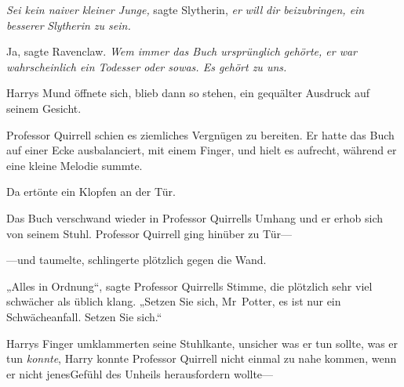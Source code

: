 \emph{Sei kein naiver kleiner Junge,} sagte Slytherin, \emph{er} \emph{will} \emph{dir beizubringen, ein} \emph{besserer} \emph{Slytherin zu sein.}

Ja, sagte Ravenclaw. \emph{Wem immer das Buch ursprünglich gehörte, er war wahrscheinlich ein Todesser oder sowas. Es gehört zu uns.}

Harrys Mund öffnete sich, blieb dann so stehen, ein gequälter Ausdruck auf seinem Gesicht.

Professor Quirrell schien es ziemliches Vergnügen zu bereiten. Er hatte das Buch auf einer Ecke ausbalanciert, mit einem Finger, und hielt es aufrecht, während er eine kleine Melodie summte.

Da ertönte ein Klopfen an der Tür.

Das Buch verschwand wieder in Professor Quirrells Umhang und er erhob sich von seinem Stuhl. Professor Quirrell ging hinüber zu Tür—

—und taumelte, schlingerte plötzlich gegen die Wand.

„Alles in Ordnung“, sagte Professor Quirrells Stimme, die plötzlich sehr viel schwächer als üblich klang. „Setzen Sie sich, Mr~Potter, es ist nur ein Schwächeanfall. Setzen Sie sich.“

Harrys Finger umklammerten seine Stuhlkante, unsicher was er tun sollte, was er tun \emph{konnte}, Harry konnte Professor Quirrell nicht einmal zu nahe kommen, wenn er nicht jenesGefühl des Unheils herausfordern wollte—


